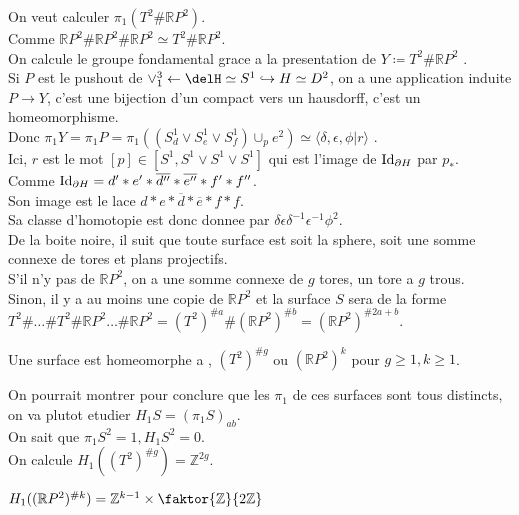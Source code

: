 \documentclass[../main.tex]{subfiles}
\begin{document}
On veut calculer $\pi_1\left( T^{2}\# \mathbb{R}P^{2}\right) $.\\
Comme $ \mathbb{R}P^{2} \# \mathbb{R}P^{2} \# \mathbb{R}P^{2}\simeq T^{2} \# \mathbb{R}P^{2}$.\\
On calcule le groupe fondamental grace a la presentation de $Y \coloneqq T^{2}\# \mathbb{R}P^{2}$ .\\
Si $P$ est le pushout de $ \vee_1^{3} \leftarrow \delH \simeq S^{1}\hookrightarrow H \simeq D^{2}$, on a une application induite $P\to Y$, c'est une bijection d'un compact vers un hausdorff, c'est un homeomorphisme.\\
Donc $\pi_1 Y = \pi_1 P = \pi_1\left( ( S^{1}_d \vee S^{1}_e\vee S^{1}_f)\cup_p e^{2} \right) \simeq \langle \delta, \epsilon, \phi | r\rangle$ .\\
Ici, $r$ est le mot $[p] \in \left[ S^{1}, S^{1}\vee S^{1}\vee S^{1}\right] $ 	qui est l'image de $\operatorname{Id}_{\partial H} $ par $p_\ast$.\\
Comme $\operatorname{Id}_{\partial H} = d' \ast e' \ast \overline{d''} \ast \overline{e''} \ast f' \ast f''$.\\
Son image est le lace $d\ast e \ast \overline{d} \ast \overline{e} \ast f \ast f $.\\
Sa classe d'homotopie est donc donnee par $\delta \epsilon \delta^{-1}\epsilon^{-1} \phi^{2}$.\\
De la boite noire, il suit que toute surface est soit la sphere, soit une somme connexe de tores et plans projectifs.\\
S'il n'y pas de $ \mathbb{R}P^{2}$, on a une somme connexe de $g$ tores, un tore a $g$ trous.\\
Sinon, il y a au moins une copie de $ \mathbb{R}P^{2}$ et la surface $S$ sera de la forme $ T^{2} \# \ldots \# T^{2} \# \mathbb{R}P^{2} \ldots \# \mathbb{R}P^{2}= ( T^{2})^{\# a} \# ( \mathbb{R}P^{2})^{\# b} = ( \mathbb{R}P^{2})^{\#2a+b}$.
\begin{thm}
	Une surface est homeomorphe a , $ ( T^{2} )^{\# g}$  ou $ ( \mathbb{R}P^{2})^{k}$ pour $g \geq 1, k \geq 1$.
\end{thm}
On pourrait montrer pour conclure que les $\pi_1$ de ces surfaces sont tous distincts, on va plutot etudier  $H_1 S = ( \pi_1S)_{ab} $.\\
On sait que $\pi_1 S^{2} =1 , H_1 S^{2}=0$.\\
On calcule $H_1( ( T^{2}) ^{\# g}) = \mathbb{Z}^{2g}$.
\begin{lemma}
$H_1(  ( \mathbb{R}P^{2})^{\# k}) = \mathbb{Z}^{k-1}\times \faktor { \mathbb{Z}} { 2\mathbb{Z}} $ 
\end{lemma}
\end{document}
